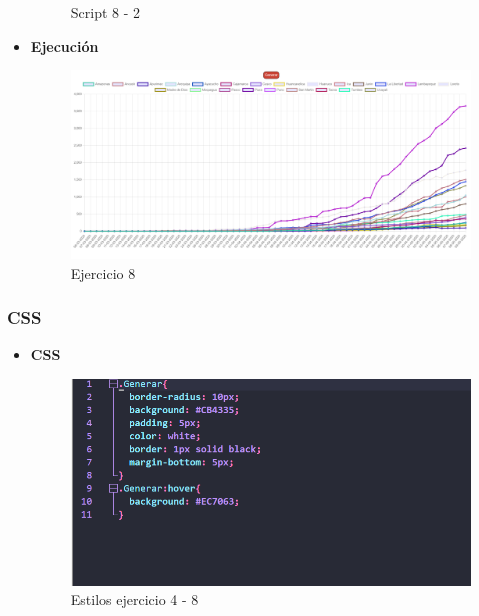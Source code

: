 \documentclass{article}
\begin{document}
\begin{itemize}
\begin{figure}[H]
			\caption{Script 8 - 2}
		\end{figure}
		\item \textbf{Ejecución}
		\begin{figure}[H]
			\centering
			\includegraphics[width=1\textwidth,keepaspectratio]{img/Ejecucion8.png}
			\caption{Ejercicio 8}
		\end{figure}
	\end{itemize}
	\subsubsection{CSS}
	\begin{itemize}
		\item \textbf{CSS}
		\begin{figure}[H]
			\centering
			\includegraphics[width=1\textwidth,keepaspectratio]{img/css1.png}
			\caption{Estilos ejercicio 4 - 8}
		\end{figure}
	\end{itemize}
\end{document}
